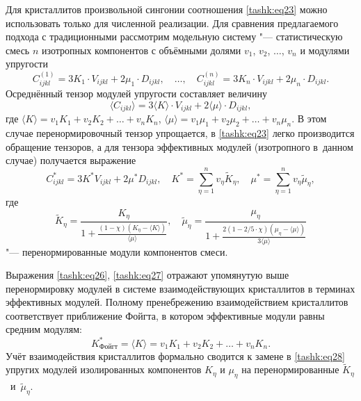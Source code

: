 Для кристаллитов произвольной сингонии соотношения \eqref{tashk:eq23} можно использовать только для численной реализации. 
Для сравнения предлагаемого подхода с традиционными рассмотрим модельную систему "--- статистическую смесь $n$ изотропных компонентов с объёмными долями $v_1$, $v_2$, $\ldots$, $v_n$ и модулями упругости
\begin{equation}
\label{tashk:eq24}
C_{ijkl}^{(1)} =3K_1 \cdot V_{ijkl} +2\mu _1 \cdot D_{ijkl} ,\quad \dots,
\quad C_{ijkl}^{(n)} =3K_n \cdot V_{ijkl} +2\mu _n \cdot D_{ijkl}.
\end{equation}
Осреднённый тензор модулей упругости составляет величину
\begin{equation}
\label{tashk:eq25}
\langle C_{ijkl} \rangle =3\langle K\rangle \cdot V_{ijkl} +2\langle \mu
\rangle \cdot D_{ijkl},
\end{equation}
где $\langle K \rangle =v_1 K_1 +v_2 K_2 +\ldots+v_n K_n $, $\langle \mu \rangle
=v_1 \mu _1 +v_2 \mu _2 + \ldots+v_n \mu _n$.
В этом случае перенормировочный тензор упрощается, в \eqref{tashk:eq23} легко производится
обращение тензоров, а для тензора эффективных модулей (изотропного в~данном
случае) получается выражение
\begin{equation}
\label{tashk:eq26}
C_{ijkl}^\ast =3K^\ast V_{ijkl} +2\mu ^\ast D_{ijkl},
\quad
K^\ast =\sum\limits_{\eta =1}^n v_\eta \tilde {K}_\eta,\quad \mu^\ast
=\sum\limits_{\eta =1}^n v_\eta \tilde {\mu }_\eta,
\end{equation}
где 
\begin{equation}
\label{tashk:eq27}
\tilde {K}_\eta =\frac{K_\eta }{1+\frac{(1-\chi )(K_\eta -\langle
K\rangle )}{\langle \mu \rangle }},\quad \tilde {\mu }_\eta =\frac{\mu _\eta
}{1+\frac{2(1-2/5\cdot \chi )(\mu _\eta -\langle \mu \rangle
)}{3\langle \mu \rangle }}
\end{equation}
"--- перенормированные модули компонентов смеси.

Выражения \eqref{tashk:eq26}, \eqref{tashk:eq27} отражают упомянутую выше перенормировку модулей в
системе взаимодействующих кристаллитов в терминах эффективных модулей.
Полному пренебрежению взаимодействием кристаллитов соответствует приближение
Фойгта, в котором эффективные модули равны средним модулям:
\begin{equation}
\label{tashk:eq28}
K_{\text{Фойгт}}^\ast =\langle K \rangle =v_1 K_1 +v_2 K_2 +\ldots+v_n K_n.
\end{equation}
Учёт взаимодействия кристаллитов формально сводится к замене в \eqref{tashk:eq28} упругих
модулей изолированных компонентов $K_\eta$ и $\mu_\eta$ на
перенормированные $\tilde {K}_\eta$~и~$\tilde {\mu }_\eta$.

